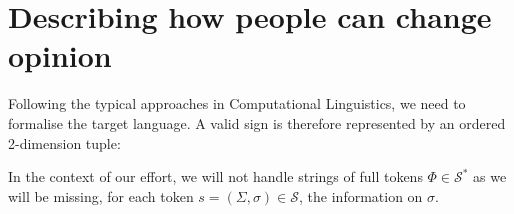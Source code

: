 
\section{Describing how people can change opinion}
\label{sec:model}

Following the typical approaches in Computational Linguistics, we need to formalise the target language.
A valid sign is therefore represented by an ordered 2-dimension tuple:

In the context of our effort, we will not handle strings of full tokens $\Phi \in \mathcal{S}^\ast$ as we will
be missing, for each token $s = (\Sigma, \sigma) \in \mathcal{S}$, the information on $\sigma$.
